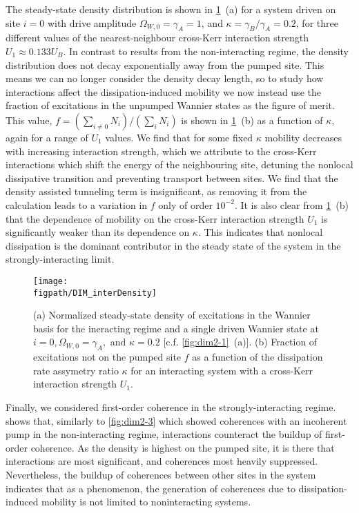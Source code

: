 The steady-state density distribution is shown in \cref{fig:dim3-2}~(a) for a system driven on site \(i=0\) with drive amplitude \(\Omega_{W,0} = \gamma_{A} = 1\), and \(\kappa = \gamma_{B}/\gamma_{A} = 0.2\), for three different values of the nearest-neighbour cross-Kerr interaction strength \(U_{1} \approx 0.133U_{B}\). In contrast to results from the non-interacting regime, the density distribution does not decay exponentially away from the pumped site. This means we can no longer consider the density decay length, so to study how interactions affect the dissipation-induced mobility we now instead use the fraction of excitations in the unpumped Wannier states as the figure of merit. This value, \(f = (\sum_{i \neq 0} N_{i}) / (\sum_{i} N_{i})\) is shown in \cref{fig:dim3-2}~(b) as a function of \(\kappa\), again for a range of \(U_{1}\) values. We find that for some fixed \(\kappa\) mobility decreases with increasing interaction strength, which we attribute to the cross-Kerr interactions which shift the energy of the neighbouring site, detuning the nonlocal dissipative transition and preventing transport between sites. We find that the density assisted tunneling term is insignificant, as removing it from the calculation leads to a variation in \(f\) only of order \(10^{-2}\). It is also clear from \cref{fig:dim3-2}~(b) that the dependence of mobility on the cross-Kerr interaction strength \(U_{1}\) is significantly weaker than its dependence on \(\kappa\). This indicates that nonlocal dissipation is the dominant contributor in the steady state of the system in the strongly-interacting limit. 

\begin{figure}[ht!]
\centering 
\texttt{[image: \\figpath/DIM\_interDensity]}
\caption{\label{fig:dim3-2}(a) Normalized steady-state density of excitations in the Wannier basis for the ineracting regime and a single driven Wannier state at \(i=0, \Omega_{W,0} = \gamma_{A},\) and \(\kappa = 0.2\) [c.f. \cref{fig:dim2-1}~(a)]. (b) Fraction of excitations not on the pumped site \(f\) as a function of the dissipation rate assymetry ratio \(\kappa\) for an interacting system with a cross-Kerr interaction strength \(U_{1}\).}
\end{figure}

Finally, we considered first-order coherence in the strongly-interacting regime.  shows that, similarly to \cref{fig:dim2-3} which showed coherences with an incoherent pump in the non-interacting regime, interactions counteract the buildup of first-order coherence. As the density is highest on the pumped site, it is there that interactions are most significant, and coherences most heavily suppressed. Nevertheless, the buildup of coherences between other sites in the system indicates that as a phenomenon, the generation of coherences due to dissipation-induced mobility is not limited to noninteracting systems.

